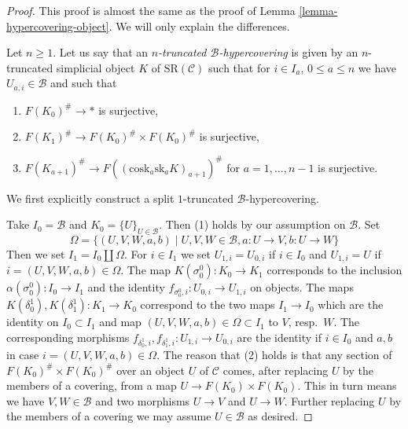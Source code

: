 \begin{proof}
This proof is almost the same as the proof of
Lemma \ref{lemma-hypercovering-object}. We will
only explain the differences.

\medskip\noindent
Let $n \geq 1$. Let us say that an
{\it $n$-truncated $\mathcal{B}$-hypercovering}
is given by an $n$-truncated simplicial
object $K$ of $\text{SR}(\mathcal{C})$
such that for $i \in I_a$, $0 \leq a \leq n$
we have $U_{a, i} \in \mathcal{B}$ and such that
\begin{enumerate}
\item $F(K_0)^\# \to *$ is surjective,
\item $F(K_1)^\# \to F(K_0)^\# \times F(K_0)^\#$ is surjective,
\item $F(K_{a + 1})^\# \to F((\text{cosk}_a \text{sk}_a K)_{a + 1})^\#$
for $a = 1, \ldots, n - 1$ is surjective.
\end{enumerate}
We first explicitly construct a split $1$-truncated $\mathcal{B}$-hypercovering.

\medskip\noindent
Take $I_0 = \mathcal{B}$ and $K_0 = \{U\}_{U \in \mathcal{B}}$.
Then (1) holds by our assumption on $\mathcal{B}$. Set
$$
\Omega =
\{(U, V, W, a, b) \mid U, V, W \in \mathcal{B}, a : U \to V, b : U \to W\}
$$
Then we set $I_1 = I_0 \amalg \Omega$. For $i \in I_1$ we set
$U_{1, i} = U_{0, i}$ if $i \in I_0$ and $U_{1, i} = U$
if $i = (U, V, W, a, b) \in \Omega$. The map
$K(\sigma^0_0) : K_0 \to K_1$ corresponds to the
inclusion $\alpha(\sigma^0_0) : I_0 \to I_1$
and the identity $f_{\sigma^0_0, i} : U_{0, i} \to U_{1, i}$
on objects. The maps $K(\delta^1_0), K(\delta^1_1) : K_1 \to K_0$
correspond to the two maps $I_1 \to I_0$ which are the
identity on $I_0 \subset I_1$ and map $(U, V, W, a, b) \in \Omega \subset I_1$
to $V$, resp.\ $W$. The corresponding morphisms
$f_{\delta^1_0, i}, f_{\delta^1_1, i} : U_{1, i} \to U_{0, i}$ are
the identity if $i \in I_0$ and $a, b$ in case $i = (U, V, W, a, b) \in \Omega$.
The reason that (2) holds is that any section of
$F(K_0)^\# \times F(K_0)^\#$ over an object $U$ of $\mathcal{C}$
comes, after replacing $U$ by the members of a covering,
from a map $U \to F(K_0) \times F(K_0)$.
This in turn means we have $V, W \in \mathcal{B}$
and two morphisms $U \to V$ and $U \to W$. Further replacing
$U$ by the members of a covering we may assume $U \in \mathcal{B}$
as desired.


\end{proof}
